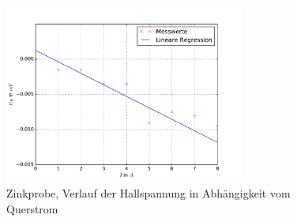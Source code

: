 \begin{figure}
  \centering
  \includegraphics[width=0.7\textwidth]{pics/u_h_zink_konstB.pdf}
  \caption{Zinkprobe, Verlauf der Hallspannung in Abhängigkeit vom Querstrom}
  \label{fig: uh_konstB_zink}
\end{figure}


